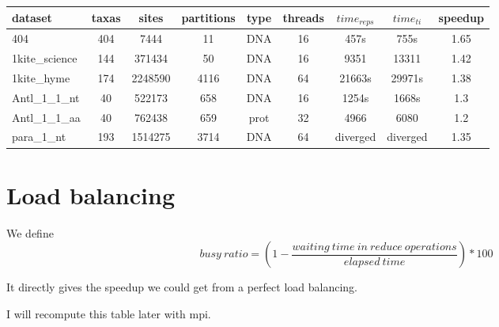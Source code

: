 \documentclass[a4paper]{article}
\begin{document}
\begin{tabular}{|l|c|c|c|c|c|c|c|c|}
\hline dataset                    & taxas & sites    & partitions & type & threads & $time_{reps}$ & $time_{ti}$ & speedup\\
\hline 404                        & 404   &  7444    & 11         & DNA  & 16 & 457s     &  755s     & 1.65  \\
\hline 1kite\_science             & 144   &  371434  & 50         & DNA  & 16 & 9351     &  13311    & 1.42  \\
\hline 1kite\_hyme                & 174   &  2248590 & 4116       & DNA  & 64 & 21663s   &  29971s   & 1.38 \\
\hline Antl\_1\_1\_nt             & 40    &  522173  & 658        & DNA  & 16 & 1254s    &  1668s    & 1.3  \\
\hline Antl\_1\_1\_aa             & 40    &  762438  & 659        & prot & 32 & 4966     &  6080     & 1.2\\
\hline para\_1\_nt                & 193   &  1514275 & 3714       & DNA  & 64 & diverged &  diverged & 1.35  \\
\hline 
\end{tabular}\newline
\newline


\section{Load balancing}

We define
$$busy\ ratio = (1 - \frac{waiting\ time\ in\ reduce\ operations}{elapsed\ time}) * 100$$

It directly gives the speedup we could get from a perfect load balancing.\newline

I will recompute this table later with mpi.




\end{document}
